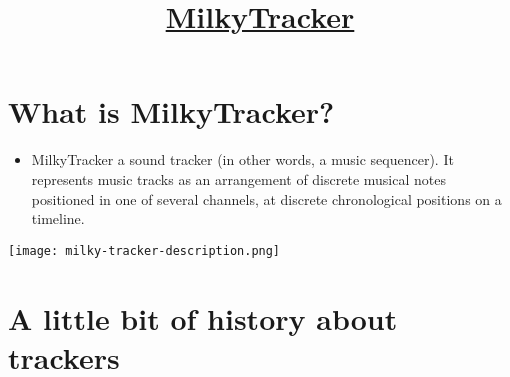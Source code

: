 
\title{\href{http://www.milkytracker.org/}{MilkyTracker}}

\maketitle
\tableofcontents

\section{What is MilkyTracker?}

\begin{itemize}
\item MilkyTracker a sound tracker (in other words, a music
  sequencer). It represents music tracks as an arrangement of discrete
  musical notes positioned in one of several channels, at discrete
  chronological positions on a timeline.
\end{itemize}

\begin{center}
  \texttt{[image: milky-tracker-description.png]}
\end{center}

\section{A little bit of history about trackers}

